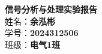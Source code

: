 \documentclass[12pt,a4paper]{article}
\begin{document}
\begin{center}
    \vspace*{2cm}
    {\Huge \textbf{信号分析与处理实验报告}}\\[2cm]
    
    \Large
    姓\quad\quad 名：\textbf{余泓彬} \\[1em]
    学\quad\quad 号：\textbf{2024312506} \\[1em]
    班\quad\quad 级：\textbf{电气1班} \\[3cm]
\end{center}

\newpage

\tableofcontents
\newpage


\newpage

\newpage

\newpage

\end{document}
